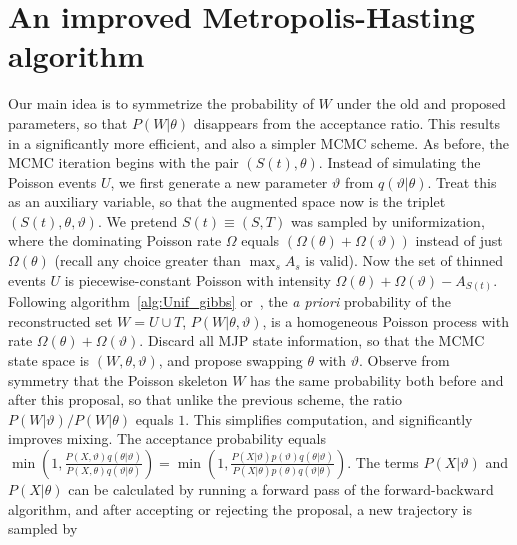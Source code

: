 
\section{An improved Metropolis-Hasting algorithm}
Our main idea is to symmetrize the probability of $W$ under the old and 
proposed parameters, so that 
$P(W|\theta)$ disappears from the acceptance ratio. This results
in a significantly more efficient, and also a simpler MCMC scheme.
As before, the MCMC iteration begins with the pair $(S(t), \theta)$. 
Instead of simulating the Poisson events $U$, we first generate a new 
parameter $\vartheta$ from $q(\vartheta|\theta)$. Treat this as an 
auxiliary variable, so that the augmented space now is the triplet 
$(S(t), \theta,\vartheta)$. We pretend $S(t) \equiv (S,T)$ was sampled by  
uniformization, where the dominating Poisson rate $\Omega$ equals 
$(\Omega(\theta) + \Omega(\vartheta))$ instead of just $\Omega(\theta)$ 
(recall any choice greater than $\max_s A_s$ is valid).
Now the set of thinned events $U$ is piecewise-constant
Poisson with intensity $\Omega(\theta) + \Omega(\vartheta) - 
A_{S(t)}$. Following algorithm~\ref{alg:Unif_gibbs} or~\cite{RaoTeh13}, 
the {\em a priori} probability of the reconstructed set $W = U \cup T$, 
$P(W|\theta,\vartheta)$, is a homogeneous Poisson 
process with rate $\Omega(\theta) + \Omega(\vartheta)$. Discard all 
MJP state information, so that the MCMC state space is $(W, \theta, \vartheta)$,
and propose swapping $\theta$ with $\vartheta$. 
Observe from
symmetry that the Poisson skeleton $W$ has the same probability both
before and after this proposal, so that unlike the previous scheme,
the ratio $P(W|\vartheta)/P(W|\theta)$ equals $1$.  This simplifies 
computation, and significantly improves mixing.
The acceptance probability 
equals
$ 
  \min\left(1, \frac{P(X,\vartheta)q(\theta|\vartheta)}
   {P(X,\theta)q(\vartheta|\theta)}\right) = 
  \min\left(1, \frac{P(X|\vartheta)p(\vartheta)q(\theta|\vartheta)}
   {P(X|\theta)p(\theta)q(\vartheta|\theta)}\right).
   $
   The terms $P(X|\vartheta)$ and  $P(X|\theta)$ can be calculated by 
   running a forward pass of the forward-backward algorithm, and after
   accepting or rejecting the proposal, a new trajectory is sampled by
